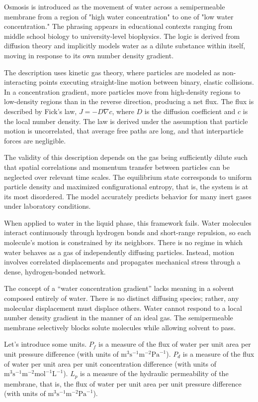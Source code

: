 Osmosis is introduced as the movement of water across a semipermeable membrane from a region of "high water concentration" to one of "low water concentration." The phrasing appears in educational contexts ranging from middle school biology to university-level biophysics. The logic is derived from diffusion theory and implicitly models water as a dilute substance within itself, moving in response to its own number density gradient.

The description uses kinetic gas theory, where particles are modeled as non-interacting points executing straight-line motion between binary, elastic collisions. In a concentration gradient, more particles move from high-density regions to low-density regions than in the reverse direction, producing a net flux. The flux is described by Fick's law, $J = -D \nabla c$, where $D$ is the diffusion coefficient and $c$ is the local number density. The law is derived under the assumption that particle motion is uncorrelated, that average free paths are long, and that interparticle forces are negligible.

The validity of this description depends on the gas being sufficiently dilute such that spatial correlations and momentum transfer between particles can be neglected over relevant time scales. The equilibrium state corresponds to uniform particle density and maximized configurational entropy, that is, the system is at its most disordered. The model accurately predicts behavior for many inert gases under laboratory conditions.

When applied to water in the liquid phase, this framework fails. Water molecules interact continuously through hydrogen bonds and short-range repulsion, so each molecule's motion is constrained by its neighbors. There is no regime in which water behaves as a gas of independently diffusing particles. Instead, motion involves correlated displacements and propagates mechanical stress through a dense, hydrogen-bonded network.

The concept of a “water concentration gradient” lacks meaning in a solvent composed entirely of water. There is no distinct diffusing species; rather, any molecular displacement must displace others. Water cannot respond to a local number density gradient in the manner of an ideal gas. The semipermeable membrane selectively blocks solute molecules while allowing solvent to pass.

Let's introduce some units. $P_f$ is a measure of the flux of water per unit area per unit pressure difference (with units of $\text{m}^3 \text{s}^{-1} \text{m}^{-2} \text{Pa}^{-1}$). $P_d$ is a measure of the flux of water per unit area per unit concentration difference (with units of $\text{m}^3 \text{s}^{-1} \text{m}^{-2} \text{mol}^{-1} \text{L}^{-1}$). $L_p$ is a measure of the hydraulic permeability of the membrane, that is, the flux of water per unit area per unit pressure difference (with units of $\text{m}^3 \text{s}^{-1} \text{m}^{-2} \text{Pa}^{-1}$).

